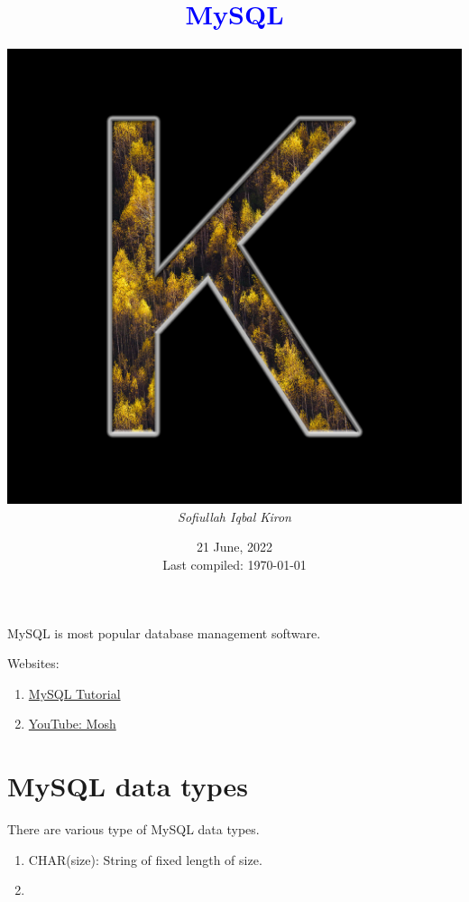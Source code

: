\documentclass[12 pt, letterpaper]{extarticle}
\title{\textcolor{blue}{MySQL}}
\author
{
	\includegraphics[scale=0.2]{User Profile.jpg} \\ %
	\textit{Sofiullah Iqbal Kiron} \\
	\R{\rule{11 cm}{2 pt}}
}
\date{21 June, 2022 \\ {\tiny Last compiled: \today}}
\begin{document}
	
	\maketitle
	\justify
	
	MySQL is most popular database management software.
	
	Websites:
	\begin{enumerate}
		\item \href{https://www.mysqltutorial.org/}{MySQL Tutorial}
		\item \href{https://youtu.be/7S_tz1z_5bA}{YouTube: Mosh}
	\end{enumerate}

	\section{MySQL data types}
	There are various type of MySQL data types.
	\begin{enumerate}
		\item CHAR(size): String of fixed length of size.
		\item 
	\end{enumerate}
	
\end{document}
